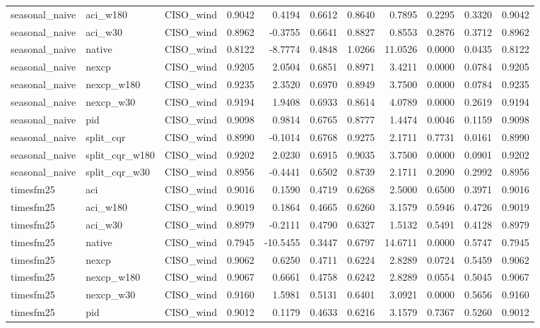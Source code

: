 \begin{tabular}{lllrrrrrrrr}
seasonal_naive & aci_w180 & CISO_wind & 0.9042 & 0.4194 & 0.6612 & 0.8640 & 0.7895 & 0.2295 & 0.3320 & 0.9042 \\
seasonal_naive & aci_w30 & CISO_wind & 0.8962 & -0.3755 & 0.6641 & 0.8827 & 0.8553 & 0.2876 & 0.3712 & 0.8962 \\
seasonal_naive & native & CISO_wind & 0.8122 & -8.7774 & 0.4848 & 1.0266 & 11.0526 & 0.0000 & 0.0435 & 0.8122 \\
seasonal_naive & nexcp & CISO_wind & 0.9205 & 2.0504 & 0.6851 & 0.8971 & 3.4211 & 0.0000 & 0.0784 & 0.9205 \\
seasonal_naive & nexcp_w180 & CISO_wind & 0.9235 & 2.3520 & 0.6970 & 0.8949 & 3.7500 & 0.0000 & 0.0784 & 0.9235 \\
seasonal_naive & nexcp_w30 & CISO_wind & 0.9194 & 1.9408 & 0.6933 & 0.8614 & 4.0789 & 0.0000 & 0.2619 & 0.9194 \\
seasonal_naive & pid & CISO_wind & 0.9098 & 0.9814 & 0.6765 & 0.8777 & 1.4474 & 0.0046 & 0.1159 & 0.9098 \\
seasonal_naive & split_cqr & CISO_wind & 0.8990 & -0.1014 & 0.6768 & 0.9275 & 2.1711 & 0.7731 & 0.0161 & 0.8990 \\
seasonal_naive & split_cqr_w180 & CISO_wind & 0.9202 & 2.0230 & 0.6915 & 0.9035 & 3.7500 & 0.0000 & 0.0901 & 0.9202 \\
seasonal_naive & split_cqr_w30 & CISO_wind & 0.8956 & -0.4441 & 0.6502 & 0.8739 & 2.1711 & 0.2090 & 0.2992 & 0.8956 \\
timesfm25 & aci & CISO_wind & 0.9016 & 0.1590 & 0.4719 & 0.6268 & 2.5000 & 0.6500 & 0.3971 & 0.9016 \\
timesfm25 & aci_w180 & CISO_wind & 0.9019 & 0.1864 & 0.4665 & 0.6260 & 3.1579 & 0.5946 & 0.4726 & 0.9019 \\
timesfm25 & aci_w30 & CISO_wind & 0.8979 & -0.2111 & 0.4790 & 0.6327 & 1.5132 & 0.5491 & 0.4128 & 0.8979 \\
timesfm25 & native & CISO_wind & 0.7945 & -10.5455 & 0.3447 & 0.6797 & 14.6711 & 0.0000 & 0.5747 & 0.7945 \\
timesfm25 & nexcp & CISO_wind & 0.9062 & 0.6250 & 0.4711 & 0.6224 & 2.8289 & 0.0724 & 0.5459 & 0.9062 \\
timesfm25 & nexcp_w180 & CISO_wind & 0.9067 & 0.6661 & 0.4758 & 0.6242 & 2.8289 & 0.0554 & 0.5045 & 0.9067 \\
timesfm25 & nexcp_w30 & CISO_wind & 0.9160 & 1.5981 & 0.5131 & 0.6401 & 3.0921 & 0.0000 & 0.5656 & 0.9160 \\
timesfm25 & pid & CISO_wind & 0.9012 & 0.1179 & 0.4633 & 0.6216 & 3.1579 & 0.7367 & 0.5260 & 0.9012 \\

\end{tabular}
